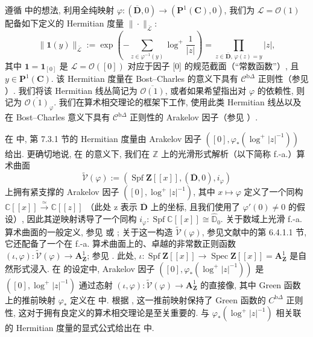 遵循 \cite[第 8.2、8.3 节]{BC22} 中的想法, 利用全纯映射 \(\varphi: (\overline{\mathbf{D}}, 0) \to (\mathbf{P}^1(\mathbf{C}), 0)\), 
我们为 \(\mathcal{L} = \mathcal{O}(1)\) 配备如下定义的 Hermitian 度量 \(\|\cdot\|_{\overline{\mathcal{L}}}\):
\[ \|\mathbf{1}(y)\|_{\overline{\mathcal{L}}} := \exp\left(-\sum_{z \in \varphi^{-1}(y)} \log^+ \frac{1}{|z|}\right) = \prod_{z \in \overline{\mathbf{D}}, \, \varphi(z) = y} |z|, \]
其中 \(\mathbf{1} = \mathbf{1}_{[0]}\) 是 \(\mathcal{L} = \mathcal{O}([0])\) 对应于因子 [0] 的规范截面（``常数函数''）, 
且 \(y \in \mathbf{P}^1(\mathbf{C})\). 
该 Hermitian 度量在 Bost--Charles 的意义下具有 \(\mathcal{C}^{\mathrm{b}\Delta}\) 正则性（参见 \cite[第 4.1.1、4.2.1.2 节]{BC22}）. 
我们将该 Hermitian 线丛简记为 \(\overline{\mathcal{O}(1)}\), 
或者如果希望指出对 \(\varphi\) 的依赖性, 则记为 \(\overline{\mathcal{O}(1)}_{\varphi}\). 
我们在算术相交理论的框架下工作, 使用此类 Hermitian 线丛以及在 Bost--Charles 意义下具有 \(\mathcal{C}^{\mathrm{b}\Delta}\) 正则性的 Arakelov 因子（参见 \cite[第 4.5 节]{BC22}）.

\begin{remark}\label{rem:7.3.2}
在 \cite{BC22} 中, 第 7.3.1 节的 Hermitian 度量由 Arakelov 因子 \(([0], \varphi_*(\log^+ |z|^{-1}))\) 给出. 
更确切地说, 在 \cite[第 6.2.1 节使用示例 4.3.1]{BC22} 的意义下, 
我们在 \(\mathbb{Z}\) 上的光滑形式解析（以下简称 f.-a.）算术曲面
\[ \widetilde{\mathcal{V}}(\varphi) := (\operatorname{Spf} \mathbf{Z}[\![x]\!], (\overline{\mathbf{D}}, 0), i_{\varphi}) \]
上拥有紧支撑的 Arakelov 因子 \(([0], \log^+ |z|^{-1})\), 
其中 \(x \mapsto \varphi\) 定义了一个同构 \(\mathbb{C}[\![x]\!] \xrightarrow{\simeq} \mathbb{C}[\![z]\!]\) （此处 z 表示 \(\overline{\mathbf{D}}\) 上的坐标, 且我们使用了 \(\varphi'(0) \neq 0\) 的假设）, 
因此其逆映射诱导了一个同构 \(i_{\varphi} : \operatorname{Spf} \mathbb{C}[\![x]\!] \cong \widehat{\mathbb{D}}_0\). 
关于数域上光滑 f.-a. 算术曲面的一般定义, 参见 \cite[第 10.6.1 节]{Bos20} 或 \cite[第 6.1.1 节]{BC22}; 
关于这一构造 \(\widetilde{\mathcal{V}}(\varphi)\), 参见文献中的第 6.4.1.1 节, 
它还配备了一个在 f.-a. 算术曲面上的、卓越的非常数正则函数 \((\iota, \varphi) : \widetilde{\mathcal{V}}(\varphi) \to \mathbf{A}^1_{\mathbf{Z}}\); 
参见 \cite[第 7.1.1.1 节]{BC22}. 
此处, \(\iota : \operatorname{Spf} \mathbf{Z}[\![x]\!] \to \operatorname{Spec} \mathbf{Z}[\![x]\!] = \mathbf{A}^1_{\mathbf{Z}}\) 是自然形式浸入. 
在 \cite[第 7.2.1 节]{BC22} 的设定中, Arakelov 因子 \(([0], \varphi_*(\log^+ |z|^{-1}))\) 是 \(([0], \log^+ |z|^{-1})\) 
通过态射 \((\iota, \varphi) : \widetilde{\mathcal{V}}(\varphi) \to \mathbf{A}^1_{\mathbf{Z}}\) 的直接像, 
其中 Green 函数上的推前映射 \(\varphi_*\) 定义在 \cite[第 3.4.2.1 节]{BC22} 中. 
根据 \cite[推论 4.4.2(ii)]{BC22}, 这一推前映射保持了 Green 函数的 \(C^{\mathrm{b}\Delta}\) 正则性, 
这对于拥有良定义的算术相交理论是至关重要的. 
与 \(\varphi_*(\log^+ |z|^{-1})\) 相关联的 Hermitian 度量的显式公式给出在 \cite[第 5.1.2 节]{BC22} 中. \end{remark}

